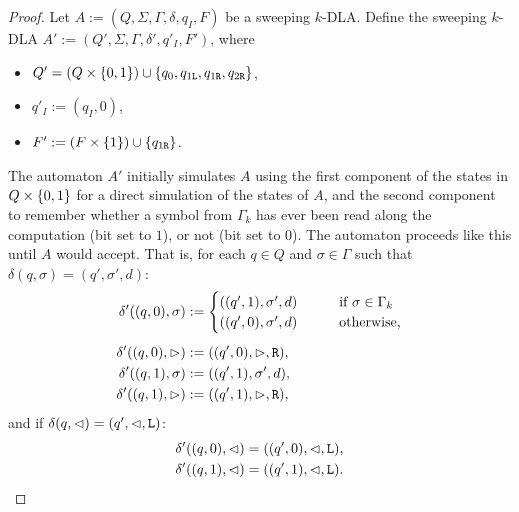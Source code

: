 \begin{proof}
	\newcommand{\ql}{q_{1\mathtt{L}}}
	\newcommand{\qr}{q_{1\mathtt{R}}}
	\newcommand{\qqr}{q_{2\mathtt{R}}}

	Let $A:=(Q,\Sigma,\Gamma,\delta,q_I,F)$ be a sweeping $k$-DLA.
	Define the sweeping $k$-DLA $A':=(Q',\Sigma,\Gamma,\delta',q'_I,F')$, where
	\begin{itemize}
		\item $Q'=(Q\times\set{0,1})\cup\set{q_0,\ql,\qr,\qqr}$,
		\item $q'_I:=(q_I,0)$,
		\item $F':=(F\times\set{1})\cup\set{\qr}$.
	\end{itemize}

	The automaton $A'$ initially simulates $A$ using the first component of the states in $Q\times\{0,1\}$ for a direct simulation of the states of $A$, and the second component to remember whether a symbol from $\Gamma_k$ has ever been read along the computation (bit set to $1$), or not (bit set to $0$).
	The automaton proceeds like this until $A$ would accept.
	That is, for each $q\in Q$ and $\sigma\in\Gamma$ such that $\delta(q,\sigma)=(q',\sigma',d)$:
	\begin{align*}
		\delta'((q,0),\sigma) & :=\begin{cases}
			                          ((q',1),\sigma',d) \qquad & \text{if }\sigma\in\Gamma_k \\
			                          ((q',0),\sigma',d) \qquad & \text{otherwise,}
		                          \end{cases} \\[1ex]
		\delta'((q,0),\rhd)   & :=((q',0),\rhd,\mathtt R) \text,                                \\
		\delta'((q,1),\sigma) & :=((q',1),\sigma',d) \text,                               \\
		\delta'((q,1),\rhd)   & :=((q',1),\rhd,\mathtt R) \text,
	\end{align*}
	and if $\delta(q,\lhd)=(q',\lhd,\mathtt L)$:
	\begin{align*}
		\delta'((q,0),\lhd) & =((q',0),\lhd,\mathtt L) \text, \\
		\delta'((q,1),\lhd) & =((q',1),\lhd,\mathtt L) \text.
	\end{align*}


\end{proof}
